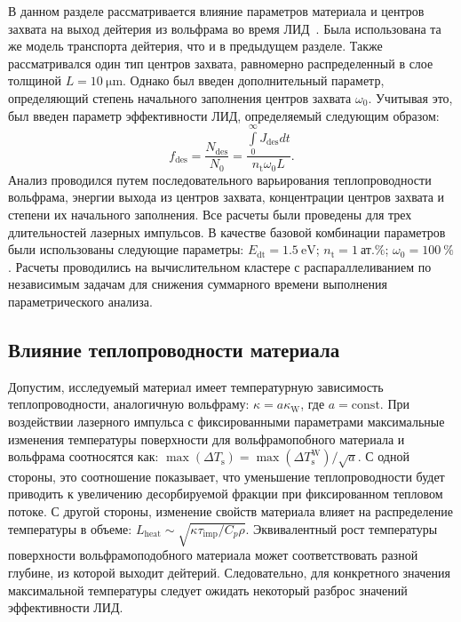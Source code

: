 В данном разделе рассматривается влияние параметров материала и центров захвата на выход дейтерия из вольфрама во время ЛИД~\cite{Kulagin2023}. Была использована та же модель транспорта дейтерия, что и в предыдущем разделе. Также рассматривался один тип центров захвата, равномерно распределенный в слое толщиной \( L=\SI{10}{\micro\meter}\). Однако был введен дополнительный параметр, определяющий степень начального заполнения центров захвата \(\omega_0 \). Учитывая это, был введен параметр эффективности ЛИД, определяемый следующим образом:
\begin{equation}
    f_\mathrm{des} = \dfrac{N_\mathrm{des}}{N_0}=\dfrac{\int\limits_0^\infty J_\mathrm{des}dt}{n_\mathrm{t}\omega_0 L}.
\end{equation}
Анализ проводился путем последовательного варьирования теплопроводности вольфрама, энергии выхода из центров захвата, концентрации центров захвата и степени их начального заполнения. Все расчеты были проведены для трех длительностей лазерных импульсов. В качестве базовой комбинации параметров были использованы следующие параметры: \(E_\mathrm{dt}=\SI{1.5}{\electronvolt} \); \( n_\mathrm{t}=\SI{1}{\text{ат.}\percent} \); \( \omega_0=\SI{100}{\percent} \). Расчеты проводились на вычислительном кластере с распараллеливанием по независимым задачам для снижения суммарного времени выполнения параметрического анализа.

\subsection{Влияние теплопроводности материала}\label{subsec:ch4/sec3/subsec1}

Допустим, исследуемый материал имеет температурную зависимость теплопроводности, аналогичную вольфраму: \( \kappa=a\kappa_\mathrm{W} \), где \(a=\mathrm{const}\). При воздействии лазерного импульса с фиксированными параметрами максимальные изменения температуры поверхности для вольфрамопобного материала и вольфрама соотносятся как: \( \max(\Delta T_\mathrm{s}) = \max(\Delta T_\mathrm{s}^{\mathrm{W}})/\sqrt{a} \). С одной стороны, это соотношение показывает, что уменьшение теплопроводности будет приводить к увеличению десорбируемой фракции при фиксированном тепловом потоке. С другой стороны, изменение свойств материала влияет на распределение температуры в объеме: \(L_\mathrm{heat}\sim \sqrt{\kappa\tau_\mathrm{imp}/C_p \rho} \). Эквивалентный рост температуры поверхности вольфрамоподобного материала может соответствовать разной глубине, из которой выходит дейтерий. Следовательно, для конкретного значения максимальной температуры следует ожидать некоторый разброс значений эффективности ЛИД.

